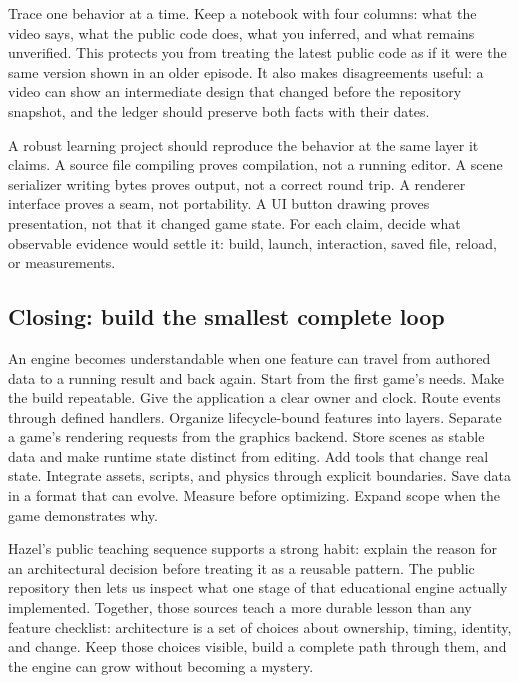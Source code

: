 Trace one behavior at a time. Keep a notebook with four columns: what the video says, what the public code does, what you inferred, and what remains unverified. This protects you from treating the latest public code as if it were the same version shown in an older episode. It also makes disagreements useful: a video can show an intermediate design that changed before the repository snapshot, and the ledger should preserve both facts with their dates.

A robust learning project should reproduce the behavior at the same layer it claims. A source file compiling proves compilation, not a running editor. A scene serializer writing bytes proves output, not a correct round trip. A renderer interface proves a seam, not portability. A UI button drawing proves presentation, not that it changed game state. For each claim, decide what observable evidence would settle it: build, launch, interaction, saved file, reload, or measurements.

\subsection{Closing: build the smallest complete loop}\label{06-engine-ii-ch042-closing-build-the-smallest-complete-loop}

An engine becomes understandable when one feature can travel from authored data to a running result and back again. Start from the first game's needs. Make the build repeatable. Give the application a clear owner and clock. Route events through defined handlers. Organize lifecycle-bound features into layers. Separate a game's rendering requests from the graphics backend. Store scenes as stable data and make runtime state distinct from editing. Add tools that change real state. Integrate assets, scripts, and physics through explicit boundaries. Save data in a format that can evolve. Measure before optimizing. Expand scope when the game demonstrates why.

Hazel's public teaching sequence supports a strong habit: explain the reason for an architectural decision before treating it as a reusable pattern. The public repository then lets us inspect what one stage of that educational engine actually implemented. Together, those sources teach a more durable lesson than any feature checklist: architecture is a set of choices about ownership, timing, identity, and change. Keep those choices visible, build a complete path through them, and the engine can grow without becoming a mystery.

